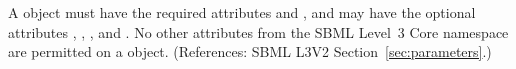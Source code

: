 A \Parameter object must have the required attributes  and
, and may have the optional attributes ,
, ,  and .  No other
attributes from the SBML Level~3 Core namespace are permitted on a
\Parameter object.  (References: SBML L3V2 Section~\ref{sec:parameters}.)

